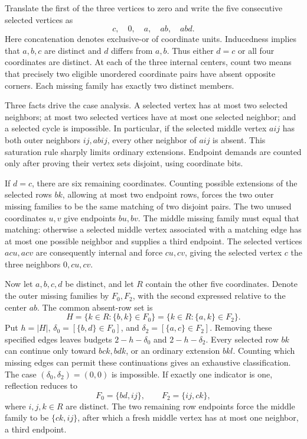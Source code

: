 \documentclass[11pt,a4paper]{article}
\theoremstyle{definition}
\theoremstyle{remark}
\begin{document}
Translate the first of the three vertices to zero and write the five consecutive selected vertices as
\[
c,\quad 0,\quad a,\quad ab,\quad abd.
\]
Here concatenation denotes exclusive-or of coordinate units. Inducedness implies that $a,b,c$ are distinct and $d$ differs from $a,b$. Thus either $d=c$ or all four coordinates are distinct. At each of the three internal centers, count two means that precisely two eligible unordered coordinate pairs have absent opposite corners. Each missing family has exactly two distinct members.

Three facts drive the case analysis. A selected vertex has at most two selected neighbors; at most two selected vertices have at most one selected neighbor; and a selected cycle is impossible. In particular, if the selected middle vertex $aij$ has both outer neighbors $ij,abij$, every other neighbor of $aij$ is absent. This saturation rule sharply limits ordinary extensions. Endpoint demands are counted only after proving their vertex sets disjoint, using coordinate bits.

If $d=c$, there are six remaining coordinates. Counting possible extensions of the selected rows $bk$, allowing at most two endpoint rows, forces the two outer missing families to be the same matching of two disjoint pairs. The two unused coordinates $u,v$ give endpoints $bu,bv$. The middle missing family must equal that matching: otherwise a selected middle vertex associated with a matching edge has at most one possible neighbor and supplies a third endpoint. The selected vertices $acu,acv$ are consequently internal and force $cu,cv$, giving the selected vertex $c$ the three neighbors $0,cu,cv$.

Now let $a,b,c,d$ be distinct, and let $R$ contain the other five coordinates. Denote the outer missing families by $F_0,F_2$, with the second expressed relative to the center $ab$. The common absent-row set is
\[
H=\{k\in R:\{b,k\}\in F_0\}
 =\{k\in R:\{a,k\}\in F_2\}.
\]
Put $h=|H|$, $\delta_0=[\{b,d\}\in F_0]$, and $\delta_2=[\{a,c\}\in F_2]$. Removing these specified edges leaves budgets $2-h-\delta_0$ and $2-h-\delta_2$. Every selected row $bk$ can continue only toward $bck,bdk$, or an ordinary extension $bkl$. Counting which missing edges can permit these continuations gives an exhaustive classification. The case $(\delta_0,\delta_2)=(0,0)$ is impossible. If exactly one indicator is one, reflection reduces to
\[
F_0=\{bd,ij\},\qquad F_2=\{ij,ck\},
\]
where $i,j,k\in R$ are distinct. The two remaining row endpoints force the middle family to be $\{ck,ij\}$, after which a fresh middle vertex has at most one neighbor, a third endpoint.
\end{document}
